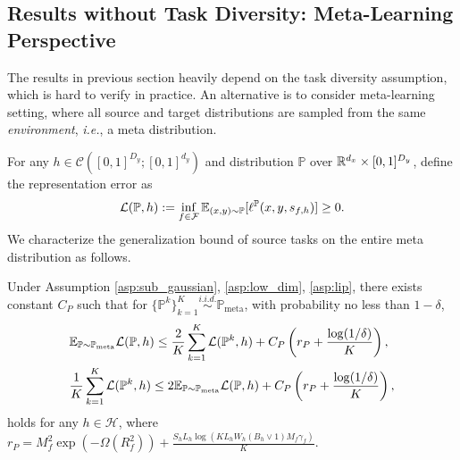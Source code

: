 \documentclass[11pt]{article}
\numberwithin{equation}{section}
\newcommand{\Pmeta}{\mathbb{P}_{\text{meta}}}
\renewcommand{\P}{\mathbb{P}}
\begin{document}
\subsection{Results without Task Diversity: Meta-Learning Perspective}

The results in previous section heavily depend on the task diversity assumption, which is hard to verify in practice.
An alternative is to consider meta-learning setting, where all source and target distributions are sampled from the same \textit{environment}, \textit{i.e.}, a meta distribution.

For any $h\in\mathcal{C}([0,1]^{D_y};[0,1]^{d_y})$ and distribution $\P$ over $\mathbb{R}^{d_x}\times[0,1]^{D_y}$, define the representation error as
\begin{equation}\label{eq:L(P,h)}
    \mathcal{L}(\P,h):=\inf_{f\in\mathcal{F}} \E_{(x,y)\sim\P}[\ell^\P(x,y,s_{f,h})]\geq 0.
\end{equation}
We characterize the generalization bound of source tasks on the entire meta distribution as follows.
\begin{prop} \label{prop:generalization_meta_informal}
    Under Assumption \ref{asp:sub_gaussian}, \ref{asp:low_dim}, \ref{asp:lip}, 
    there exists constant $C_P$
    such that for $\{\P^k\}_{k=1}^K\overset{\textit{i.i.d.}}{\sim}\Pmeta$,
    with probability no less than $1-\delta$, 
    \begin{align}
        &\E_{\P\sim\Pmeta}\mathcal{L}(\P,h)
        \leq \frac{2}{K}\sum_{k=1}^K\mathcal{L}(\P^k,h)+C_P\left(r_P+\frac{\log(1/\delta)}{K}\right), \\
        &\frac{1}{K}\sum_{k=1}^K\mathcal{L}(\P^k,h)\leq 2\E_{\P\sim\Pmeta}\mathcal{L}(\P,h)
        +C_P\left(r_P+\frac{\log(1/\delta)}{K}\right),
    \end{align}
    holds for any $h\in\mathcal{H}$, where $r_P=M_f^2\exp(-\Omega(R_f^2))+\frac{S_hL_h\log\left(KL_hW_h(B_h\vee 1)M_f\gamma_f\right)}{K}$.
\end{prop}
\end{document}
